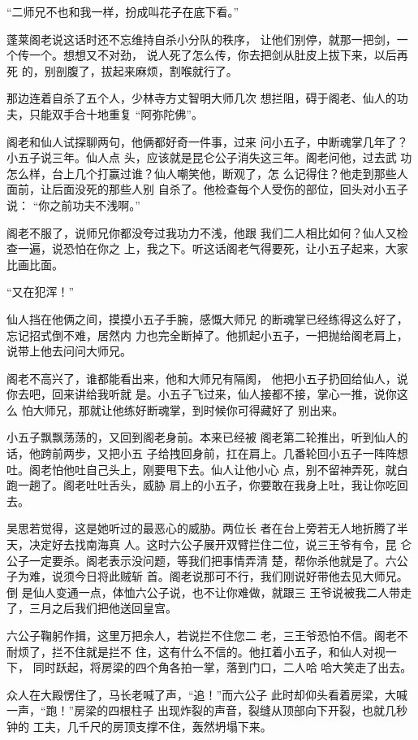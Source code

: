 “二师兄不也和我一样，扮成叫花子在底下看。”

蓬莱阁老说这话时还不忘维持自杀小分队的秩序，
让他们别停，就那一把剑，一个传一个。想想又不对劲，
说人死了怎么传，你去把剑从肚皮上拔下来，以后再死
的，别剖腹了，拔起来麻烦，割喉就行了。

那边连着自杀了五个人，少林寺方丈智明大师几次
想拦阻，碍于阁老、仙人的功夫，只能双手合十地重复
“阿弥陀佛”。

阁老和仙人试探聊两句，他俩都好奇一件事，过来
问小五子，中断魂掌几年了？小五子说三年。仙人点
头，应该就是昆仑公子消失这三年。阁老问他，过去武
功怎么样，台上几个打赢过谁？仙人嘲笑他，断观了，怎
么记得住？他走到那些人面前，让后面没死的那些人别
自杀了。他检查每个人受伤的部位，回头对小五子说：
“你之前功夫不浅啊。”

阁老不服了，说师兄你都没夸过我功力不浅，他跟
我们二人相比如何？仙人又检查一遍，说恐怕在你之
上，我之下。听这话阁老气得要死，让小五子起来，大家
比画比面。

“又在犯浑！”

仙人挡在他俩之间，摸摸小五子手腕，感慨大师兄
的断魂掌已经练得这么好了，忘记招式倒不难，居然内
力也完全断掉了。他抓起小五子，一把抛给阁老肩上，
说带上他去问问大师兄。

阁老不高兴了，谁都能看出来，他和大师兄有隔阂，
他把小五子扔回给仙人，说你去吧，回来讲给我听就
是。小五子飞过来，仙人接都不接，掌心一推，说你这么
怕大师兄，那就让他练好断魂掌，到时候你可得藏好了
别出来。

小五子飘飘荡荡的，又回到阁老身前。本来已经被
阁老第二轮推出，听到仙人的话，他跨前两步，又把小五
子给拽回身前，扛在肩上。几番轮回小五子一阵阵想
吐。阁老怕他吐自己头上，刚要甩下去。仙人让他小心
点，别不留神弄死，就白跑一趟了。阁老吐吐舌头，威胁
肩上的小五子，你要敢在我身上吐，我让你吃回去。

吴思若觉得，这是她听过的最恶心的威胁。两位长
者在台上旁若无人地折腾了半天，决定好去找南海真
人。这时六公子展开双臂拦住二位，说三王爷有令，昆
仑公子一定要杀。阁老表示没问题，等我们把事情弄清
楚，帮你杀他就是了。六公子为难，说须今日将此贼斩
首。阁老说那可不行，我们刚说好带他去见大师兄。倒
是仙人变通一点，体恤六公子说，也不让你难做，就跟三
王爷说被我二人带走了，三月之后我们把他送回皇宫。

六公子鞠躬作揖，这里万把余人，若说拦不住您二
老，三王爷恐怕不信。阁老不耐烦了，拦不住就是拦不
住，这有什么不信的。他扛着小五子，和仙人对视一下，
同时跃起，将房梁的四个角各拍一掌，落到门口，二人哈
哈大笑走了出去。

众人在大殿愣住了，马长老喊了声，“追！”而六公子
此时却仰头看着房梁，大喊一声，“跑！”房梁的四根柱子
出现炸裂的声音，裂缝从顶部向下开裂，也就几秒钟的
工夫，几千尺的房顶支撑不住，轰然坍塌下来。

\newpage